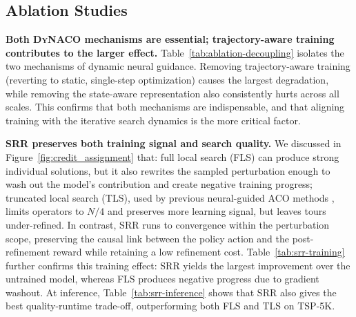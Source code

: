 \documentclass[sigconf]{acmart}
\newcommand{\DyNACO}{\textsc{DyNACO}}
\begin{document}
\subsection{Ablation Studies}
\label{sec:ablations}
\smallskip\noindent\textbf{Both \DyNACO{} mechanisms are essential; trajectory-aware training contributes to the larger effect.}
Table~\ref{tab:ablation-decoupling} isolates the two mechanisms of dynamic neural guidance.
Removing trajectory-aware training (reverting to static, single-step optimization) causes the largest degradation, while removing the state-aware representation also consistently hurts across all scales.
This confirms that both mechanisms are indispensable, and that aligning training with the iterative search dynamics is the more critical factor.

\begin{table}[t]
\centering
\caption{Decoupling the two mechanisms of dynamic neural guidance. We reported Gap (\%) of 16 instances to BKS at I$_{1000}$.}
\label{tab:ablation-decoupling}
\small
{}
\end{table}

\smallskip\noindent\textbf{SRR preserves both training signal and search quality.} We discussed in Figure~\ref{fig:credit_assignment} that: full local search (FLS) can produce strong individual solutions, but it also rewrites the sampled perturbation enough to wash out the model's contribution and create negative training progress; truncated local search (TLS), used by previous neural-guided ACO methods \cite{deepaco,gfacs}, limits operators to $N/4$ and preserves more learning signal, but leaves tours under-refined.
In contrast, SRR runs to convergence within the perturbation scope, preserving the causal link between the policy action and the post-refinement reward while retaining a low refinement cost. Table~\ref{tab:srr-training} further confirms this training effect: SRR yields the largest improvement over the untrained model, whereas FLS produces negative progress due to gradient washout. At inference, Table~\ref{tab:srr-inference} shows that SRR also gives the best quality-runtime trade-off, outperforming both FLS and TLS on TSP-5K.
\end{document}

